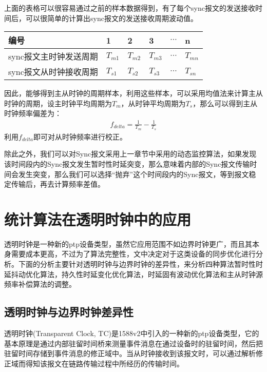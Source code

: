 上面的表格可以很容易通过之前的样本数据得到，有了每个sync报文的发送接收时间后，可以很简单的计算出sync报文的发送接收周期波动值。
\begin{table}[htpb]
  \centering
  \begin{tabular}{llllll} \toprule
    编号 & 1 & 2 & 3 & $\cdots$ & n \\ \midrule
    sync报文主时钟发送周期 & $T_{m1}$ & $T_{m2}$ & $T_{m3}$ & $\cdots$ & $T_{mn}$ \\ \midrule
    sync报文从时钟接收周期 & $T_{s1}$ & $T_{s2}$ & $T_{s3}$ & $\cdots$ & $T_{sn}$  \\ \bottomrule
  \end{tabular}
\end{table}

因此，能够得到主从时钟的周期样本，利用这些样本，可以采用均值法来计算主从时钟的周期，设主时钟平均周期为$T_{m}$，从时钟平均周期为$T_{s}$，那么可以得到主从时钟频率偏差为：
\begin {align}
f_{delta} = \frac{1}{T_{m}} - \frac{1}{T_{s}}
\end{align}
利用$f_{delta}$即可对从时钟频率进行校正。

除此之外，我们可以对Sync报文采用上一章节中采用的动态监控算法，如果发现该时间段内的Sync报文发生暂时性时延突变，那么意味着内部的Sync报文传输时间会发生突变，那么我们可以选择“抛弃”这个时间段内的Sync报文，等到报文稳定传输后，再去计算频率差值。

\section{统计算法在透明时钟中的应用}
透明时钟是一种新的ptp设备类型，虽然它应用范围不如边界时钟更广，而且其本身需要成本更高，不过为了算法完整性，文中决定对于这类设备的同步优化进行分析。下面的分析主要针对透明时钟与边界时钟的差异性，来分析四种算法暂时性时延抖动优化算法，持久性时延变化优化算法，时延固有波动优化算法和主从时钟源频率补偿算法的调整。

\subsection{透明时钟与边界时钟差异性}
透明时钟(Transparent Clock, TC)是1588v2中引入的一种新的ptp设备类型，它的基本原理是通过内部驻留时间桥来测量事件消息在通过设备时的驻留时间，然后把驻留时间存储到事件消息的修正域中。当从时钟接收到该报文时，可以通过解析修正域而得知该报文在链路传输过程中所经历的传输时间。

